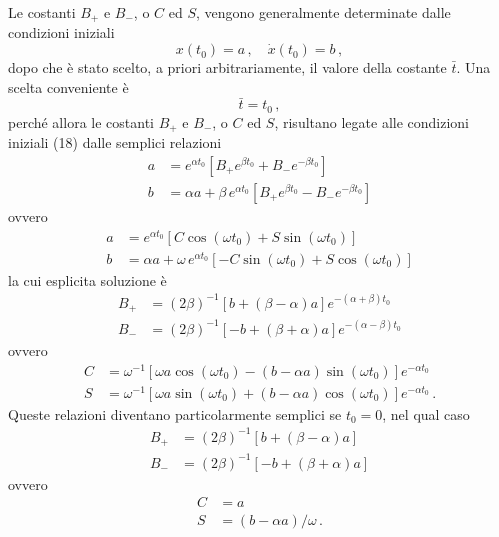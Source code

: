 \documentclass[11pt, a4paper]{book}
\numberwithin{equation}{section}
\begin{document}
Le costanti $B_+$ e $B_-$, o $C$ ed $S$, vengono generalmente determinate dalle
condizioni iniziali
\begin{equation}
    x(t_0) = a \,, \quad \dot{x}(t_0) = b \,, \tag{18}
\end{equation}
dopo che è stato scelto, a priori arbitrariamente, il valore della costante $\bar{t}$.
Una scelta conveniente è
\begin{equation}
    \bar{t} = t_0 \,, \tag{19}
\end{equation}
perché allora le costanti $B_+$ e $B_-$, o $C$ ed $S$, risultano legate alle condizioni
iniziali (18) dalle semplici relazioni
\begin{align}
    a &= e^{\alpha t_0} \left[ B_+ e^{\beta t_0} + B_- e^{-\beta t_0} \right] \tag{20a} \\
    b &= \alpha a + \beta \, e^{\alpha t_0} \left[ B_+ e^{\beta t_0} - B_- e^{-\beta t_0} \right] \tag{20b}
\end{align}
ovvero
\begin{align}
    a &= e^{\alpha t_0} \left[ C \cos(\omega t_0) + S \sin(\omega t_0) \right] \tag{21a} \\
    b &= \alpha a + \omega \, e^{\alpha t_0} \left[ -C \sin(\omega t_0) + S \cos(\omega t_0) \right] \tag{21b}
\end{align}
la cui esplicita soluzione è
\begin{align}
    B_+ &= (2\beta)^{-1} \left[ b + (\beta - \alpha) a \right] e^{-(\alpha+\beta)t_0} \tag{22a} \\
    B_- &= (2\beta)^{-1} \left[ -b + (\beta+\alpha) a \right] e^{-(\alpha-\beta)t_0} \tag{22b}
\end{align}
ovvero
\begin{align}
    C &= \omega^{-1} \left[ \omega a \cos(\omega t_0) - (b - \alpha a) \sin(\omega t_0) \right] e^{-\alpha t_0} \tag{23a} \\
    S &= \omega^{-1} \left[ \omega a \sin(\omega t_0) + (b - \alpha a) \cos(\omega t_0) \right] e^{-\alpha t_0} \,. \tag{23b}
\end{align}
Queste relazioni diventano particolarmente semplici se $t_0 = 0$, nel qual caso
\begin{align}
    B_+ &= (2\beta)^{-1} \left[ b + (\beta - \alpha) a \right] \tag{24a} \\
    B_- &= (2\beta)^{-1} \left[ -b + (\beta + \alpha) a \right] \tag{24b}
\end{align}
ovvero
\begin{align}
    C &= a \tag{25a} \\
    S &= (b - \alpha a)/\omega \,. \tag{25b}
\end{align}
\end{document}
